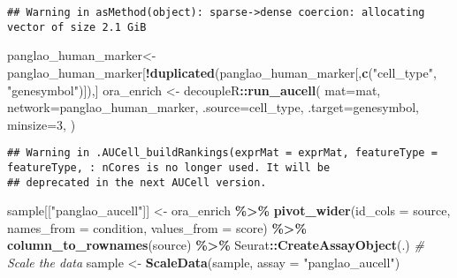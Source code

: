 \documentclass[
]{article}
\newenvironment{Shaded}{\begin{snugshade}}{\end{snugshade}}
\newcommand{\AttributeTok}[1]{\textcolor[rgb]{0.13,0.29,0.53}{#1}}
\newcommand{\CommentTok}[1]{\textcolor[rgb]{0.56,0.35,0.01}{\textit{#1}}}
\newcommand{\DecValTok}[1]{\textcolor[rgb]{0.00,0.00,0.81}{#1}}
\newcommand{\FunctionTok}[1]{\textcolor[rgb]{0.13,0.29,0.53}{\textbf{#1}}}
\newcommand{\NormalTok}[1]{#1}
\newcommand{\OtherTok}[1]{\textcolor[rgb]{0.56,0.35,0.01}{#1}}
\newcommand{\SpecialCharTok}[1]{\textcolor[rgb]{0.81,0.36,0.00}{\textbf{#1}}}
\newcommand{\StringTok}[1]{\textcolor[rgb]{0.31,0.60,0.02}{#1}}
\begin{document}
\begin{verbatim}
## Warning in asMethod(object): sparse->dense coercion: allocating vector of size 2.1 GiB
\end{verbatim}

\begin{Shaded}
\begin{Highlighting}[]
\NormalTok{panglao\_human\_marker}\OtherTok{\textless{}{-}}\NormalTok{ panglao\_human\_marker[}\SpecialCharTok{!}\FunctionTok{duplicated}\NormalTok{(panglao\_human\_marker[,}\FunctionTok{c}\NormalTok{(}\StringTok{"cell\_type"}\NormalTok{, }\StringTok{"genesymbol"}\NormalTok{)]),]}
\NormalTok{ora\_enrich }\OtherTok{\textless{}{-}}\NormalTok{ decoupleR}\SpecialCharTok{::}\FunctionTok{run\_aucell}\NormalTok{(}
    \AttributeTok{mat=}\NormalTok{mat,}
    \AttributeTok{network=}\NormalTok{panglao\_human\_marker,}
    \AttributeTok{.source=}\StringTok{\textquotesingle{}cell\_type\textquotesingle{}}\NormalTok{,}
    \AttributeTok{.target=}\StringTok{\textquotesingle{}genesymbol\textquotesingle{}}\NormalTok{,}
    \AttributeTok{minsize=}\DecValTok{3}\NormalTok{,}
\NormalTok{)}
\end{Highlighting}
\end{Shaded}

\begin{verbatim}
## Warning in .AUCell_buildRankings(exprMat = exprMat, featureType = featureType, : nCores is no longer used. It will be
## deprecated in the next AUCell version.
\end{verbatim}

\begin{Shaded}
\begin{Highlighting}[]
\NormalTok{sample[[}\StringTok{"panglao\_aucell"}\NormalTok{]] }\OtherTok{\textless{}{-}}\NormalTok{   ora\_enrich }\SpecialCharTok{\%\textgreater{}\%}
  \FunctionTok{pivot\_wider}\NormalTok{(}\AttributeTok{id\_cols =} \StringTok{\textquotesingle{}source\textquotesingle{}}\NormalTok{, }\AttributeTok{names\_from =} \StringTok{\textquotesingle{}condition\textquotesingle{}}\NormalTok{,}
              \AttributeTok{values\_from =} \StringTok{\textquotesingle{}score\textquotesingle{}}\NormalTok{) }\SpecialCharTok{\%\textgreater{}\%}
  \FunctionTok{column\_to\_rownames}\NormalTok{(}\StringTok{\textquotesingle{}source\textquotesingle{}}\NormalTok{) }\SpecialCharTok{\%\textgreater{}\%}
\NormalTok{  Seurat}\SpecialCharTok{::}\FunctionTok{CreateAssayObject}\NormalTok{(.)}
\CommentTok{\# Scale the data}
\NormalTok{sample }\OtherTok{\textless{}{-}} \FunctionTok{ScaleData}\NormalTok{(sample, }\AttributeTok{assay =} \StringTok{"panglao\_aucell"}\NormalTok{)}
\end{Highlighting}
\end{Shaded}
\end{document}
